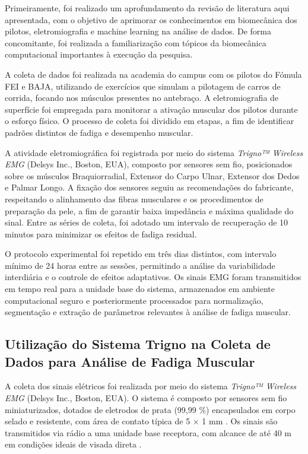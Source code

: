 \documentclass[symbols]{fei}
\begin{document}
Primeiramente, foi realizado um aprofundamento da revisão de literatura aqui apresentada, com o objetivo de aprimorar os conhecimentos 
em biomecânica dos pilotos, eletromiografia e machine learning na análise de dados. De forma concomitante, foi realizada a 
familiarização com tópicos da biomecânica computacional importantes à execução da pesquisa.

A coleta de dados foi realizada na academia do campus com os pilotos do Fómula FEI e BAJA, utilizando de exercícios que simulam a 
pilotagem de carros de corrida, focando nos músculos presentes no antebraço. A eletromiografia de superfície foi empregada para 
monitorar a ativação muscular dos pilotos durante o esforço físico. O processo de coleta foi dividido em etapas, a fim de identificar 
padrões distintos de fadiga e desempenho muscular.

A atividade eletromiográfica foi registrada por meio do sistema \textit{Trigno™ Wireless EMG} (Delsys Inc., Boston, EUA), 
composto por sensores sem fio, posicionados sobre os músculos Braquiorradial, Extensor do Carpo Ulnar, 
Extensor dos Dedos e Palmar Longo. A fixação dos sensores seguiu as recomendações do fabricante, respeitando o 
alinhamento das fibras musculares e os procedimentos de preparação da pele, a 
fim de garantir baixa impedância e máxima qualidade do sinal. Entre as séries de coleta, foi adotado um intervalo 
de recuperação de 10 minutos para minimizar os efeitos de fadiga residual. 

O protocolo experimental foi repetido em três dias distintos, com intervalo mínimo de 24 horas entre as sessões, 
permitindo a análise da variabilidade interdiária e o controle de efeitos adaptativos. Os sinais EMG foram transmitidos 
em tempo real para a unidade base do sistema, armazenados em ambiente computacional seguro e posteriormente processados 
para normalização, segmentação e extração de parâmetros relevantes à análise de fadiga muscular.

\subsection{Utilização do Sistema Trigno na Coleta de Dados para Análise de Fadiga Muscular}

A coleta dos sinais elétricos foi realizada por meio do sistema \textit{Trigno™ Wireless EMG} (Delsys Inc., Boston, EUA). 
O sistema é composto por sensores sem fio miniaturizados, dotados de eletrodos de prata (99,99 \%) encapsulados em corpo selado e 
resistente, com área de contato típica de 5 × 1 mm \cite{trigno_manual}. Os sinais são transmitidos via rádio a uma unidade 
base receptora, com alcance de até 40 m em condições ideais de visada direta \cite{trigno_specs}.
\end{document}
